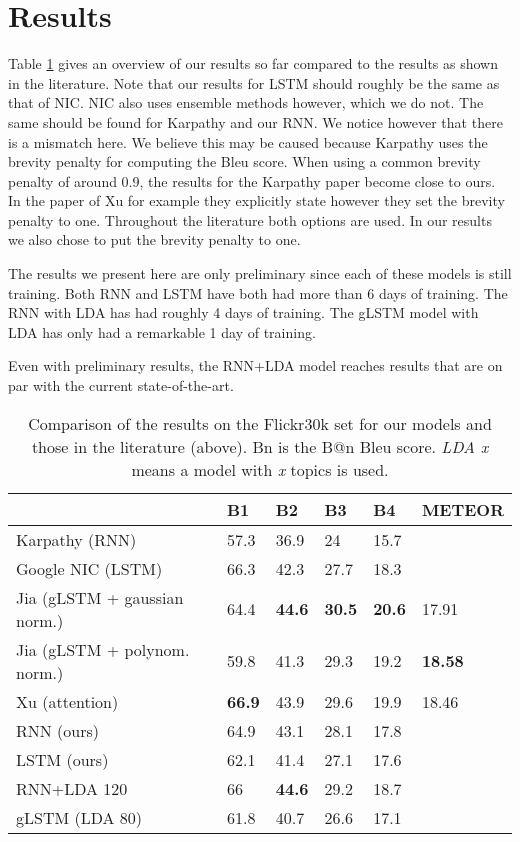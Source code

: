 \documentclass{article}
\begin{document}
\section{Results}
Table \ref{results} gives an overview of our results so far compared to the results as shown in the literature.
Note that our results for LSTM should roughly be the same as that of NIC. NIC also uses ensemble methods however, which we do not. The same should be found for Karpathy and our RNN. We notice however that there is a mismatch here.
We believe this may be caused because Karpathy uses the brevity penalty for computing the Bleu score. When using a common brevity penalty of around 0.9, the results for the Karpathy paper become close to ours. In the paper of Xu for example they explicitly state however they set the brevity penalty to one. Throughout the literature both options are used.
In our results we also chose to put the brevity penalty to one.

The results we present here are only preliminary since each of these models is still training.
Both RNN and LSTM have both had more than 6 days of training. The RNN with LDA has had roughly 4 days of training.
The gLSTM model with LDA has only had a remarkable 1 day of training.

Even with preliminary results, the RNN+LDA model reaches results that are on par with the current state-of-the-art.

\begin{table}
    \begin{tabular}{l|lllll}
    \hline
    ~                            & B1   & B2   & B3   & B4   & METEOR \\ \hline
    Karpathy (RNN)               & 57.3 & 36.9 & 24   & 15.7 & ~      \\
    Google NIC (LSTM)            & 66.3 & 42.3 & 27.7 & 18.3 & ~      \\
    Jia (gLSTM + gaussian norm.) & 64.4 & \textbf{44.6} & \textbf{30.5} & \textbf{20.6} & 17.91  \\
    Jia (gLSTM + polynom. norm.) & 59.8 & 41.3 & 29.3 & 19.2 & \textbf{18.58}  \\
    Xu (attention)               & \textbf{66.9} & 43.9 & 29.6 & 19.9 & 18.46  \\ \hline
    RNN (ours)                   & 64.9 & 43.1 & 28.1 & 17.8 & ~      \\
    LSTM (ours)                   & 62.1 & 41.4 & 27.1 & 17.6 & ~      \\
    RNN+LDA 120                      & 66   & \textbf{44.6} & 29.2 & 18.7 & ~      \\
    gLSTM (LDA 80)               & 61.8 & 40.7 & 26.6 & 17.1 & ~      \\
    \end{tabular}
    
    \caption{Comparison of the results on the Flickr30k set for our models and those in the literature (above). Bn is the B@n Bleu score. \textit{LDA x} means a model with \textit{x} topics is used.}
    \label{results}
\end{table}
\end{document}
